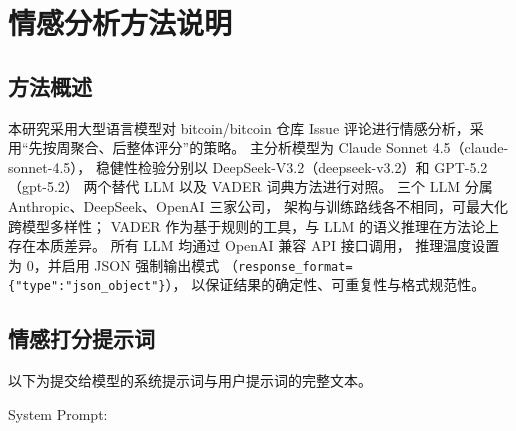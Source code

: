 \chapter{情感分析方法说明}

\section{方法概述}

本研究采用大型语言模型对 bitcoin/bitcoin 仓库 Issue 评论进行情感分析，采用“先按周聚合、后整体评分”的策略。
主分析模型为 Claude Sonnet 4.5（claude-sonnet-4.5），
稳健性检验分别以 DeepSeek-V3.2（deepseek-v3.2）和 GPT-5.2（gpt-5.2）
两个替代 LLM 以及 VADER 词典方法进行对照。
三个 LLM 分属 Anthropic、DeepSeek、OpenAI 三家公司，
架构与训练路线各不相同，可最大化跨模型多样性；
VADER 作为基于规则的工具，与 LLM 的语义推理在方法论上存在本质差异。
所有 LLM 均通过 OpenAI 兼容 API 接口调用，
推理温度设置为 0，并启用 JSON 强制输出模式
（\texttt{response\_format=\{"type":"json\_object"\}}），
以保证结果的确定性、可重复性与格式规范性。

\section{情感打分提示词}

以下为提交给模型的系统提示词与用户提示词的完整文本。

\vspace{1em}
\noindent System Prompt:

